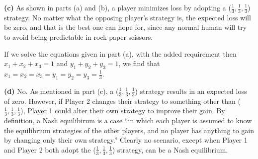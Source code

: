 \documentclass[11pt]{article}
\renewcommand\part[1]{\vspace{.10in}\textbf{(#1)}}
\begin{document}
\part{c}
As shown in parts (a) and (b), a player minimizes loss by adopting a ($\frac{1}{3},\frac{1}{3},\frac{1}{3}$) strategy. No matter what the opposing player's strategy is, the expected loss will be zero, and that is the best one can hope for, since any normal human will try to avoid being predictable in rock-paper-scissors.

If we solve the equations given in part (a), with the added requirement then $x_1 + x_2 + x_3 = 1$ and $y_1 + y_2 + y_3 = 1$, we find that $x_1 = x_2 = x_3 = y_1 = y_2 = y_3 = \frac{1}{3}$.

\part{d}
No. As mentioned in part (c), a ($\frac{1}{3},\frac{1}{3},\frac{1}{3}$) strategy results in an expected loss of zero. However, if Player 2 changes their strategy to something other than ($\frac{1}{3},\frac{1}{3},\frac{1}{3}$), Player 1 could alter their own strategy to improve their gain. By definition, a Nash equilibirum is a case ``in which each player is assumed to know the equilibrium strategies of the other players, and no player has anything to gain by changing only their own strategy.'' Clearly no scenario, except when Player 1 and Player 2 both adopt the ($\frac{1}{3},\frac{1}{3},\frac{1}{3}$) strategy, can be a Nash equilibrium.
\end{document}
